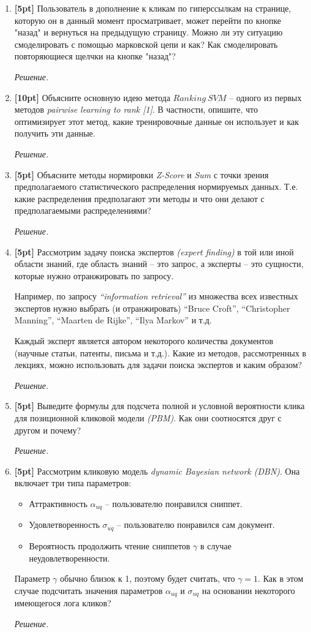 \begin{enumerate}
	\item \textbf{[5pt]} Пользователь в дополнение к кликам по гиперссылкам на странице, которую 
	он в данный момент просматривает, может перейти по кнопке "назад" и вернуться на предыдущую 
	страницу. Можно ли эту ситуацию смоделировать с помощью марковской цепи и как? Как 
	смоделировать повторяющиеся щелчки на кнопке "назад"?
	
	\textit{Решение.} 
	\item \textbf{[10pt]} Объясните основную идею метода $Ranking \ SVM$ – одного из первых 
	методов	\textit{pairwise learning to rank [1]}. В частности, опишите, что оптимизирует этот 
	метод, какие тренировочные данные он использует и как получить эти данные.
	
	\textit{Решение.}
	\item \textbf{[5pt]} Объясните методы нормировки \textit{Z-Score} и \textit{Sum} с точки 
	зрения предполагаемого статистического распределения нормируемых данных. Т.е. какие 
	распределения предполагают эти методы и что они делают с предполагаемыми распределениями?
	
	\textit{Решение.}
	\item \textbf{[5pt]} Рассмотрим задачу поиска экспертов \textit{(expert finding)} в той или 
	иной области знаний, где область знаний – это запрос, а эксперты – это сущности, которые нужно 
	отранжировать по запросу.
		
	Например, по запросу \textit{``information retrieval''} из множества всех известных 
	экспертов	нужно выбрать (и отранжировать) ``Bruce Croft'', ``Christopher Manning'', 
	``Maarten de Rijke'', ``Ilya Markov'' и т.д.
	
	Каждый эксперт является автором некоторого количества документов (научные статьи, патенты, 
	письма и т.д.). Какие из методов, рассмотренных в лекциях, можно использовать для задачи 
	поиска экспертов и каким образом?
	
	\textit{Решение.}
	\item \textbf{[5pt]} Выведите формулы для подсчета полной и условной вероятности клика для	
	позиционной кликовой модели \textit{(PBM)}. Как они соотносятся друг с другом и почему?
	
	\textit{Решение.}
	\item \textbf{[5pt]} Рассмотрим кликовую модель \textit{dynamic Bayesian network (DBN)}. Она 
	включает три типа параметров:
	
	\begin{itemize}
		\item Аттрактивность $\alpha_{uq}$ – пользователю понравился сниппет.
		\item Удовлетворенность $\sigma_{uq}$ – пользователю понравился сам документ.
		\item Вероятность продолжить чтение сниппетов $\gamma$ в случае неудовлетворенности.
	\end{itemize}
	
	Параметр $\gamma$ обычно близок к 1, поэтому будет считать, что $\gamma = 1$. Как в этом 
	случае подсчитать значения параметров $\alpha_{uq}$ и $\sigma_{uq}$ на основании некоторого 
	имеющегося лога кликов?
	
	\textit{Решение.}
\end{enumerate}
